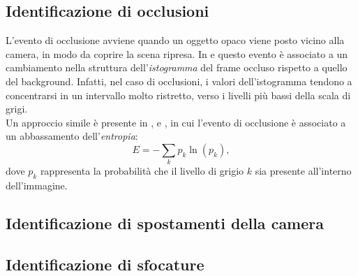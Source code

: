 \subsection{Identificazione di occlusioni}
L'evento di occlusione avviene quando un oggetto opaco viene posto vicino alla camera, in modo da coprire la scena ripresa.
In \cite{aksay2007camera} e \cite{saglam2009real} questo evento \`e associato a un cambiamento nella struttura dell'\textit{istogramma} del frame occluso rispetto a quello del background.
Infatti, nel caso di occlusioni, i valori dell'istogramma tendono a concentrarsi in un intervallo molto ristretto, verso i livelli pi\`u bassi della scala di grigi.\\
Un approccio simile \`e presente in \cite{harasse2004automated}, \cite{gil2007automatic} e \cite{ellwart2012camera}, in cui l'evento di occlusione \`e associato a un abbassamento dell'\textit{entropia}:
 \begin{equation}
 \label{eq:entropy}
 E=-\sum_{k}p_k\ln(p_k) ,
 \end{equation}
 dove $p_k$ rappresenta la probabilit\`a che il livello di grigio $k$ sia presente all'interno dell'immagine. 
\subsection{Identificazione di spostamenti della camera}
\subsection{Identificazione di sfocature} 